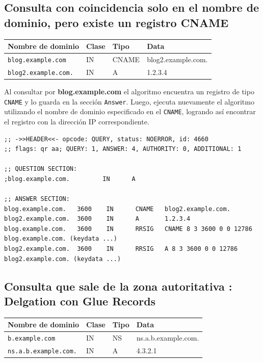 \subsection{Consulta con coincidencia solo en el nombre de dominio, pero existe un registro CNAME}

\begin{table}[h!]
\centering
\begin{tabular}{llll}
\textbf{Nombre de dominio} & \textbf{Clase} & \textbf{Tipo} & \textbf{Data} \\
\hline
\texttt{blog.example.com} & IN & CNAME & blog2.example.com. \\
\texttt{blog2.example.com.} & IN & A & 1.2.3.4 \\
\end{tabular}
\end{table}

Al consultar por \textbf{blog.example.com} el algoritmo encuentra un registro de tipo \texttt{CNAME} y lo guarda en la sección \texttt{Answer}. Luego, 
ejecuta nuevamente el algoritmo utilizando el nombre de dominio especificado en el \texttt{CNAME}, logrando así encontrar el registro con la dirección IP correspondiente.\\

\newpage

\begin{lstlisting}
;; ->>HEADER<<- opcode: QUERY, status: NOERROR, id: 4660
;; flags: qr aa; QUERY: 1, ANSWER: 4, AUTHORITY: 0, ADDITIONAL: 1

;; QUESTION SECTION:
;blog.example.com.         IN      A

;; ANSWER SECTION:
blog.example.com.   3600    IN      CNAME   blog2.example.com.
blog2.example.com.  3600    IN      A       1.2.3.4
blog.example.com.   3600    IN      RRSIG   CNAME 8 3 3600 0 0 12786 blog.example.com. (keydata ...)
blog2.example.com.  3600    IN      RRSIG   A 8 3 3600 0 0 12786 blog2.example.com. (keydata ...)

\end{lstlisting}

\subsection{Consulta que sale de la zona autoritativa : Delgation con Glue Records}

\begin{table}[h!]
\centering
\begin{tabular}{llll}
\textbf{Nombre de dominio} & \textbf{Clase} & \textbf{Tipo} & \textbf{Data} \\
\hline
\texttt{b.example.com} & IN & NS & ns.a.b.example.com. \\
\texttt{ns.a.b.example.com.} & IN & A & 4.3.2.1 \\
\end{tabular}
\end{table}

